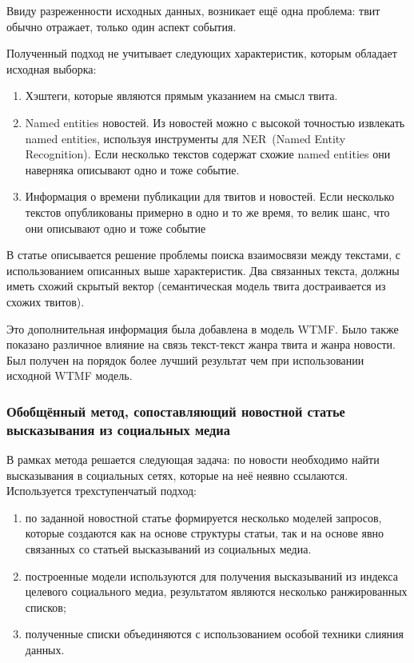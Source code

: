             Ввиду разреженности исходных данных, возникает ещё одна проблема: твит обычно отражает, только один аспект события.

            Полученный подход не учитывает следующих характеристик, которым обладает исходная выборка:
            \begin{enumerate}
                \item Хэштеги, которые являются прямым указанием на смысл твита.
                \item {\color{red} Named entities} новостей. Из новостей можно с высокой точностью извлекать {\color{red} named entities}, используя инструменты для NER~(Named Entity Recognition). Если несколько текстов содержат схожие {\color{red} named entities} они наверняка описывают одно и тоже событие.
                \item Информация о времени публикации для твитов и новостей. Если несколько текстов опубликованы примерно в одно и то же время, то велик шанс, что они описывают одно и тоже событие
            \end{enumerate}
            В статье описывается решение проблемы поиска взаимосвязи между текстами, с использованием описанных выше характеристик. Два связанных текста, должны иметь схожий скрытый вектор (семантическая модель твита достраивается из схожих твитов).

            Это дополнительная информация была добавлена в модель WTMF. Было также показано различное влияние на связь текст-текст жанра твита и жанра новости. Был получен на порядок более лучший результат чем при использовании исходной WTMF модель.

    \subsubsection{Обобщённый метод, сопоставляющий новостной статье высказывания из социальных медиа}
        В рамках метода решается следующая задача: по новости необходимо найти высказывания в социальных сетях, которые на неё неявно ссылаются.
        Используется трехступенчатый подход:
        \begin{enumerate}
            \item по заданной новостной статье формируется несколько моделей запросов, которые создаются как на основе структуры статьи, так и на основе явно связанных со статьей высказываний из социальных медиа.
            \item построенные модели используются для получения высказываний из индекса целевого социального медиа, результатом являются несколько ранжированных списков;
            \item полученные списки объединяются с использованием особой техники слияния данных.
        \end{enumerate}

